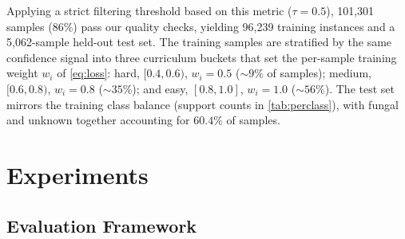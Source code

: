 \documentclass[runningheads]{llncs}
\begin{document}
Applying a strict filtering threshold based on this metric ($\tau{=}0.5$),
101,301 samples (86\%) pass our quality checks, yielding 96,239 training instances
and a 5,062-sample held-out test set. The training samples are stratified by
the same confidence signal into three curriculum buckets that set the
per-sample training weight $w_i$ of \cref{eq:loss}: hard, $[0.4,0.6)$,
$w_i{=}0.5$ (${\sim}9\%$ of samples); medium, $[0.6,0.8)$, $w_i{=}0.8$
(${\sim}35\%$); and easy, $[0.8,1.0]$, $w_i{=}1.0$ (${\sim}56\%$).
The test set mirrors the training class balance (support counts in
\cref{tab:perclass}), with fungal and unknown together accounting for
$60.4\%$ of samples.

\section{Experiments}
\label{sec:exp}

\subsection{Evaluation Framework}
\label{sec:eval}
\end{document}
